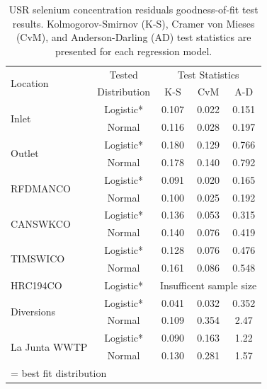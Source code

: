 \begin{linenumbers}
\begin{table}[htbp]
  \centering
  \caption[USR selenium concentration residuals goodness-of-fit test results.]{USR selenium concentration residuals goodness-of-fit test results.  Kolmogorov-Smirnov (K-S), Cramer von Mieses (CvM), and Anderson-Darling (AD) test statistics are presented for each regression model.}
    \begin{tabular}{lcccc}
    \toprule
    \multirow{2}{*}{Location}&Tested & \multicolumn{3}{c}{Test Statistics} \\ \cline{3-5}
    &Distribution  & K-S   & CvM   & A-D \\
    \midrule
    \midrule
    \multirow{2}{*}{Inlet}			&Logistic*	&0.107	&0.022	&0.151 \\
    								&Normal		&0.116	&0.028	&0.197 \\
    \midrule
    \multirow{2}{*}{Outlet}			&Logistic*	&0.180	&0.129	&0.766	\\
    								&Normal		&0.178	&0.140	&0.792	\\
    \midrule
    \multirow{2}{*}{RFDMANCO}		&Logistic*	&0.091	&0.020	&0.165	\\
    								&Normal		&0.100	&0.025	&0.192	\\
    \midrule
    \multirow{2}{*}{CANSWKCO}		&Logistic*	&0.136	&0.053	&0.315	\\
    								&Normal		&0.140	&0.076	&0.419	\\
    \midrule
    \multirow{2}{*}{TIMSWICO}		&Logistic*	&0.128	&0.076	&0.476	\\
    								&Normal		&0.161	&0.086	&0.548	\\
    \midrule
    HRC194CO						&Logistic*	&\multicolumn{3}{c}{Insufficent sample size}\\
    \midrule
    \multirow{2}{*}{Diversions}		&Logistic*	&0.041	&0.032	&0.352	\\
    								&Normal		&0.109	&0.354	&2.47	\\
    \midrule
    \multirow{2}{*}{La Junta WWTP}	&Logistic*	&0.090	&0.163	&1.22	\\
    								&Normal		&0.130	&0.281	&1.57	\\
    \bottomrule
    \multicolumn{5}{l}{\footnotesize * = best fit distribution}\\
    \end{tabular}%
  \label{tab:USRGoF}%
\end{table}%


\end{linenumbers}
